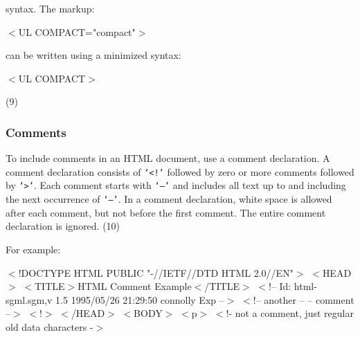 syntax.  The markup:
\par $<$UL COMPACT="compact"$>$
\par 
can be written using a minimized syntax:
\par $<$UL COMPACT$>$
\par (9)\par \subsubsection*{Comments}\par 
To include comments in an HTML document, use a comment declaration.  A
comment declaration consists of {\tt `$<$!'} followed by zero or more
comments followed by {\tt `$>$'}.  Each comment starts with {\tt `--'} and
includes all text up to and including the next occurrence of
{\tt `--'}.  In a comment declaration, white space is allowed after
each comment, but not before the first comment.  The entire comment
declaration is ignored.
(10)\par \par 
For example:
\par $<$!DOCTYPE HTML PUBLIC "-//IETF//DTD HTML 2.0//EN"$>$
$<$HEAD$>$
$<$TITLE$>$HTML Comment Example$<$/TITLE$>$
$<$!-- Id: html-sgml.sgm,v 1.5 1995/05/26 21:29:50 connolly Exp  --$>$
$<$!-- another -- -- comment --$>$
$<$!$>$
$<$/HEAD$>$
$<$BODY$>$
$<$p$>$ $<$!- not a comment, just regular old data characters -$>$
